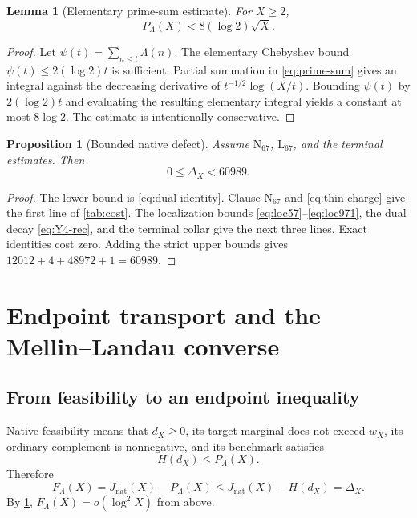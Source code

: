 \documentclass[11pt]{article}
\newtheorem{lemma}[theorem]{Lemma}
\newtheorem{proposition}[theorem]{Proposition}
\theoremstyle{definition}
\theoremstyle{remark}
\newcommand{\1}{\mathbf 1}
\newcommand{\Nat}{\mathrm{nat}}
\begin{document}
\begin{lemma}[Elementary prime-sum estimate]\label{lem:cheb}
For \(X\ge2\),
\begin{equation}\label{eq:prime-cheb}
P_\Lambda(X)<8(\log2)\sqrt X.
\end{equation}
\end{lemma}

\begin{proof}
Let \(\psi(t)=\sum_{n\le t}\Lambda(n)\).  The elementary Chebyshev bound \(\psi(t)\le 2(\log2)t\) is sufficient.  Partial summation in \eqref{eq:prime-sum} gives an integral against the decreasing derivative of \(t^{-1/2}\log(X/t)\).  Bounding \(\psi(t)\) by \(2(\log2)t\) and evaluating the resulting elementary integral yields a constant at most \(8\log2\).  The estimate is intentionally conservative.
\end{proof}

\begin{proposition}[Bounded native defect]\label{prop:60989}
Assume \(\mathrm N_{67}\), \(\mathrm L_{67}\), and the terminal estimates.  Then
\begin{equation}\label{eq:60989}
0\le\Delta_X<60989.
\end{equation}
\end{proposition}

\begin{proof}
The lower bound is \eqref{eq:dual-identity}.  Clause \(\mathrm N_{67}\) and \eqref{eq:thin-charge} give the first line of \cref{tab:cost}.  The localization bounds \eqref{eq:loc57}--\eqref{eq:loc971}, the dual decay \eqref{eq:Y4-rec}, and the terminal collar give the next three lines.  Exact identities cost zero.  Adding the strict upper bounds gives \(12012+4+48972+1=60989\).
\end{proof}

\section{Endpoint transport and the Mellin--Landau converse}\label{sec:endpoint}

\subsection{From feasibility to an endpoint inequality}

Native feasibility means that \(d_X\ge0\), its target marginal does not exceed \(w_X\), its ordinary complement is nonnegative, and its benchmark satisfies
\begin{equation}\label{eq:feasible-H}
H(d_X)\le P_\Lambda(X).
\end{equation}
Therefore
\begin{equation}\label{eq:FleDelta}
F_\Lambda(X)=J_{\Nat}(X)-P_\Lambda(X)
\le J_{\Nat}(X)-H(d_X)=\Delta_X.
\end{equation}
By \cref{prop:60989}, \(F_\Lambda(X)=o(\log^2X)\) from above.
\end{document}
